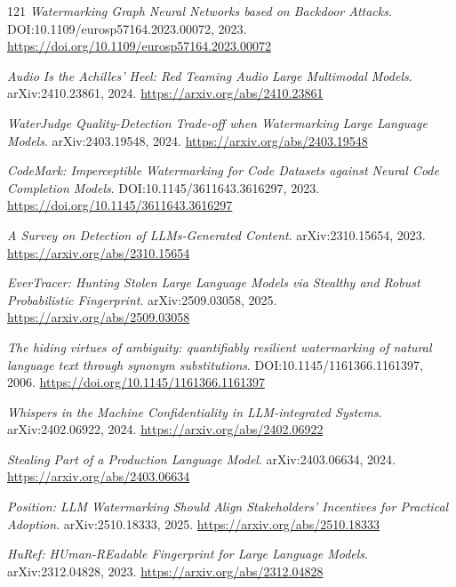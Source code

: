 \documentclass[11pt,a4paper]{article}
\begin{document}
\begin{thebibliography}{121}
\newblock \emph{Watermarking Graph Neural Networks based on Backdoor Attacks}.
\newblock DOI:10.1109/eurosp57164.2023.00072, 2023.
\newblock \url{https://doi.org/10.1109/eurosp57164.2023.00072}

\newblock \emph{Audio Is the Achilles' Heel: Red Teaming Audio Large Multimodal Models}.
\newblock arXiv:2410.23861, 2024.
\newblock \url{https://arxiv.org/abs/2410.23861}

\newblock \emph{WaterJudge Quality-Detection Trade-off when Watermarking Large Language Models}.
\newblock arXiv:2403.19548, 2024.
\newblock \url{https://arxiv.org/abs/2403.19548}

\newblock \emph{CodeMark: Imperceptible Watermarking for Code Datasets against Neural Code Completion Models}.
\newblock DOI:10.1145/3611643.3616297, 2023.
\newblock \url{https://doi.org/10.1145/3611643.3616297}

\newblock \emph{A Survey on Detection of LLMs-Generated Content}.
\newblock arXiv:2310.15654, 2023.
\newblock \url{https://arxiv.org/abs/2310.15654}

\newblock \emph{EverTracer: Hunting Stolen Large Language Models via Stealthy and Robust Probabilistic Fingerprint}.
\newblock arXiv:2509.03058, 2025.
\newblock \url{https://arxiv.org/abs/2509.03058}

\newblock \emph{The hiding virtues of ambiguity: quantifiably resilient watermarking of natural language text through synonym substitutions}.
\newblock DOI:10.1145/1161366.1161397, 2006.
\newblock \url{https://doi.org/10.1145/1161366.1161397}

\newblock \emph{Whispers in the Machine Confidentiality in LLM-integrated Systems}.
\newblock arXiv:2402.06922, 2024.
\newblock \url{https://arxiv.org/abs/2402.06922}

\newblock \emph{Stealing Part of a Production Language Model}.
\newblock arXiv:2403.06634, 2024.
\newblock \url{https://arxiv.org/abs/2403.06634}

\newblock \emph{Position: LLM Watermarking Should Align Stakeholders' Incentives for Practical Adoption}.
\newblock arXiv:2510.18333, 2025.
\newblock \url{https://arxiv.org/abs/2510.18333}

\newblock \emph{HuRef: HUman-REadable Fingerprint for Large Language Models}.
\newblock arXiv:2312.04828, 2023.
\newblock \url{https://arxiv.org/abs/2312.04828}


\end{thebibliography}
\end{document}

